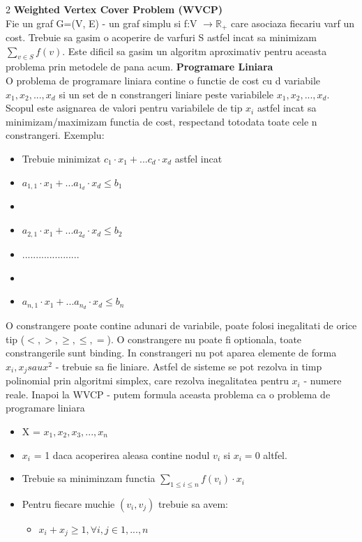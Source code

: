 \documentclass[a4paper]{article}
\begin{document}
\begin{multicols}{2}
\textbf{Weighted Vertex Cover Problem (WVCP)} \\
Fie un graf G=(V, E) - un graf simplu si f:V $\to \mathbb{R}_{+}$ care asociaza fiecariu varf un cost. 
Trebuie sa gasim o acoperire de varfuri S astfel incat sa minimizam $\sum\limits_{v \in S} f(v)$. Este dificil sa gasim un algoritm aproximativ pentru aceasta problema prin metodele de pana acum.
\textbf{Programare Liniara} \\
O problema de programare liniara contine o functie de cost cu d variabile $x_1, x_2,...,x_d$ si un set de n constrangeri liniare peste variabilele $x_1, x_2,...,x_d$. Scopul este asignarea de valori pentru variabilele de tip $x_i$ astfel incat sa minimizam/maximizam functia de cost, respectand totodata toate cele n constrangeri. Exemplu:
\begin{itemize}
    \item Trebuie minimizat $ c_1\cdot x_1 + ... c_d \cdot x_d$ astfel incat
    \item $a_{1,1} \cdot x_1 + ... a_{1_d} \cdot x_d \leq b_1$
    \item \item $a_{2,1} \cdot x_1 + ... a_{2_d} \cdot x_d \leq b_2$
    \item .....................
    \item \item $a_{n,1} \cdot x_1 + ... a_{n_d} \cdot x_d \leq b_n$
\end{itemize}
O constrangere poate contine adunari de variabile, poate folosi inegalitati de orice tip ($<, >, \geq, \leq, =$). O constrangere nu poate fi optionala, toate constrangerile sunt binding. In constrangeri nu pot aparea elemente de forma $x_i, x_j sau x^2$ - trebuie sa fie liniare. Astfel de sisteme se pot rezolva in timp polinomial prin algoritmi simplex, care rezolva inegalitatea pentru $x_i$ - numere reale.
Inapoi la WVCP - putem formula aceasta problema ca o problema de programare liniara
\begin{itemize}
    \item X = {$x_1, x_2, x_3,...,x_n$}
    \item $x_i$ = 1 daca acoperirea aleasa contine nodul $v_i$ si $x_i = 0$ altfel.
    \item Trebuie sa miniminzam functia $\sum\limits_{1 \leq i \leq n} f(v_i) \cdot x_i$
    \item Pentru fiecare muchie $(v_i, v_j)$ trebuie sa avem:
    \begin{itemize}
    \item $x_i + x_j \geq 1, \forall i,j \in {1,...,n}$

\end{itemize}
\end{itemize}
\end{multicols}
\end{document}
